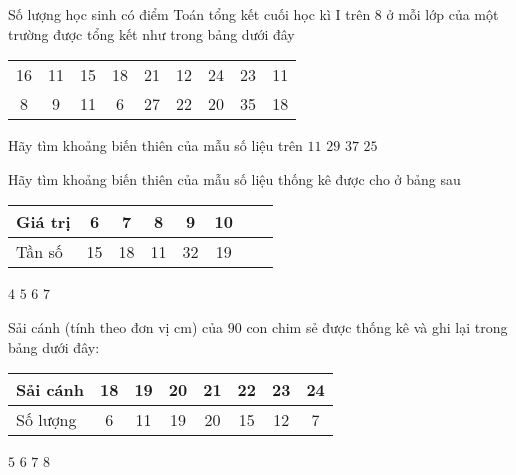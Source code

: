 \begin{ex}%
	Số lượng học sinh có điểm Toán tổng kết cuối học kì I trên $ 8 $ ở mỗi lớp của một trường được tổng kết như trong bảng dưới đây
	\begin{longtable}{ccccccccc}
		16 & 11 & 15 & 18 & 21 & 12 & 24 & 23 & 11\\
		8 & 9 & 11 & 6 & 27 & 22 & 20 & 35 & 18
	\end{longtable}
	Hãy tìm khoảng biến thiên của mẫu số liệu trên
	\choice
	{$11$}
	{\True $29$}
	{$37$}
	{$25$}
\end{ex}

\begin{ex}%
	Hãy tìm khoảng biến thiên của mẫu số liệu thống kê được cho ở bảng sau
	\begin{longtable}{|l|c|c|c|c|c|c|c|}
		\hline
		Giá trị & 6 & 7 & 8 & 9 & 10\\
		\hline
		Tần số & 15 & 18 & 11 & 32 & 19\\
		\hline
	\end{longtable}
	\choice
	{\True $4$}
	{$5$}
	{$6$}
	{$7$}
\end{ex}

\begin{ex}%
	Sải cánh (tính theo đơn vị cm) của $90$ con chim sẻ được thống kê và ghi lại trong bảng dưới đây:
	\begin{longtable}{|l|c|c|c|c|c|c|c|}
		\hline
		Sải cánh & 18 & 19 & 20 & 21 & 22 & 23 & 24\\
		\hline
		Số lượng & 6 & 11 & 19 & 20 & 15 & 12 & 7\\
		\hline
	\end{longtable}
	\choice
	{$5$}
	{\True $6$}
	{$7$}
	{$8$}
\end{ex}

